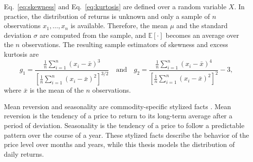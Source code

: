 Eq.~\eqref{eq:skewness} and Eq.~\eqref{eq:kurtosis} are defined over a random variable $X$. In practice, the distribution of returns is unknown and only a sample of $n$ observations $x_1, \dots, x_n$ is available. Therefore, the mean $\mu$ and the standard deviation $\sigma$ are computed from the sample, and $\mathbb{E}[\cdot]$ becomes an average over the $n$ observations. The resulting sample estimators of skewness and excess kurtosis are 
\begin{equation}
g_1 = \frac{\frac{1}{n} \sum_{i=1}^{n} (x_i - \bar{x})^3}
           {\left[ \frac{1}{n} \sum_{i=1}^{n} (x_i - \bar{x})^2 \right]^{3/2}}
\quad \text{and} \quad
g_2 = \frac{\frac{1}{n} \sum_{i=1}^{n} (x_i - \bar{x})^4}
           {\left[ \frac{1}{n} \sum_{i=1}^{n} (x_i - \bar{x})^2 \right]^{2}} - 3,
\label{eq:g1-g2}
\end{equation}
where $\bar{x}$ is the mean of the $n$ observations.

Mean reversion and seasonality are commodity-specific stylized facts \parencite[64--68]{gemanCommoditiesCommodityDerivatives2005}. Mean reversion is the tendency of a price to return to its long-term average after a period of deviation. Seasonality is the tendency of a price to follow a predictable pattern over the course of a year. These stylized facts describe the behavior of the price level over months and years, while this thesis models the distribution of daily returns. 
